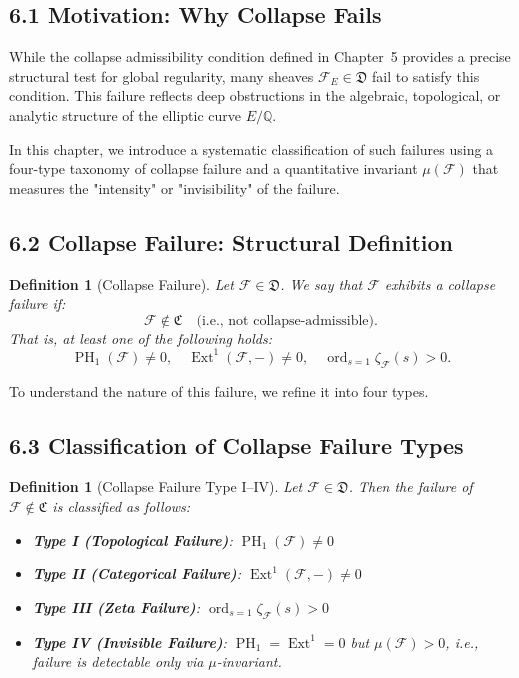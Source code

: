 \documentclass[11pt]{article}
\newtheorem{definition}[theorem]{Definition}
\DeclareMathOperator{\Ext}{Ext}
\DeclareMathOperator{\PH}{PH}
\newcommand{\ord}{\operatorname{ord}}
\begin{document}
\subsection*{6.1 Motivation: Why Collapse Fails}

While the collapse admissibility condition defined in Chapter~5 provides a precise structural test for global regularity, many sheaves \( \mathcal{F}_E \in \mathfrak{D} \) fail to satisfy this condition. This failure reflects deep obstructions in the algebraic, topological, or analytic structure of the elliptic curve \( E/\mathbb{Q} \).

In this chapter, we introduce a systematic classification of such failures using a four-type taxonomy of collapse failure and a quantitative invariant \( \mu(\mathcal{F}) \) that measures the "intensity" or "invisibility" of the failure.

\subsection*{6.2 Collapse Failure: Structural Definition}

\begin{definition}[Collapse Failure]
Let \( \mathcal{F} \in \mathfrak{D} \). We say that \( \mathcal{F} \) exhibits a \emph{collapse failure} if:
\[
\mathcal{F} \notin \mathfrak{C} \quad \text{(i.e., not collapse-admissible)}.
\]
That is, at least one of the following holds:
\[
\PH_1(\mathcal{F}) \neq 0, \quad \Ext^1(\mathcal{F}, -) \neq 0, \quad \ord_{s=1} \zeta_{\mathcal{F}}(s) > 0.
\]
\end{definition}

To understand the nature of this failure, we refine it into four types.

\subsection*{6.3 Classification of Collapse Failure Types}

\begin{definition}[Collapse Failure Type I–IV]
Let \( \mathcal{F} \in \mathfrak{D} \). Then the failure of \( \mathcal{F} \notin \mathfrak{C} \) is classified as follows:

\begin{itemize}
  \item \textbf{Type I (Topological Failure)}: \( \PH_1(\mathcal{F}) \neq 0 \)
  \item \textbf{Type II (Categorical Failure)}: \( \Ext^1(\mathcal{F}, -) \neq 0 \)
  \item \textbf{Type III (Zeta Failure)}: \( \ord_{s=1} \zeta_{\mathcal{F}}(s) > 0 \)
  \item \textbf{Type IV (Invisible Failure)}: \( \PH_1 = \Ext^1 = 0 \) but \( \mu(\mathcal{F}) > 0 \), i.e., failure is detectable only via \(\mu\)-invariant.
\end{itemize}
\end{definition}
\end{document}
